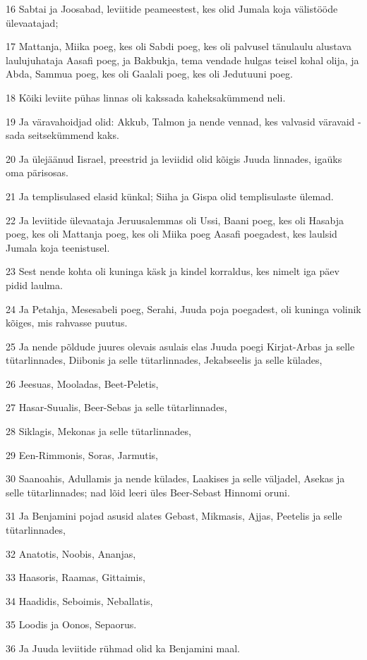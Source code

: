 \par 16 Sabtai ja Joosabad, leviitide peameestest, kes olid Jumala koja välistööde ülevaatajad;
\par 17 Mattanja, Miika poeg, kes oli Sabdi poeg, kes oli palvusel tänulaulu alustava laulujuhataja Aasafi poeg, ja Bakbukja, tema vendade hulgas teisel kohal olija, ja Abda, Sammua poeg, kes oli Gaalali poeg, kes oli Jedutuuni poeg.
\par 18 Kõiki leviite pühas linnas oli kakssada kaheksakümmend neli.
\par 19 Ja väravahoidjad olid: Akkub, Talmon ja nende vennad, kes valvasid väravaid - sada seitsekümmend kaks.
\par 20 Ja ülejäänud Iisrael, preestrid ja leviidid olid kõigis Juuda linnades, igaüks oma pärisosas.
\par 21 Ja templisulased elasid künkal; Siiha ja Gispa olid templisulaste ülemad.
\par 22 Ja leviitide ülevaataja Jeruusalemmas oli Ussi, Baani poeg, kes oli Hasabja poeg, kes oli Mattanja poeg, kes oli Miika poeg Aasafi poegadest, kes laulsid Jumala koja teenistusel.
\par 23 Sest nende kohta oli kuninga käsk ja kindel korraldus, kes nimelt iga päev pidid laulma.
\par 24 Ja Petahja, Mesesabeli poeg, Serahi, Juuda poja poegadest, oli kuninga volinik kõiges, mis rahvasse puutus.
\par 25 Ja nende põldude juures olevais asulais elas Juuda poegi Kirjat-Arbas ja selle tütarlinnades, Diibonis ja selle tütarlinnades, Jekabseelis ja selle külades,
\par 26 Jeesuas, Mooladas, Beet-Peletis,
\par 27 Hasar-Suualis, Beer-Sebas ja selle tütarlinnades,
\par 28 Siklagis, Mekonas ja selle tütarlinnades,
\par 29 Een-Rimmonis, Soras, Jarmutis,
\par 30 Saanoahis, Adullamis ja nende külades, Laakises ja selle väljadel, Asekas ja selle tütarlinnades; nad lõid leeri üles Beer-Sebast Hinnomi oruni.
\par 31 Ja Benjamini pojad asusid alates Gebast, Mikmasis, Ajjas, Peetelis ja selle tütarlinnades,
\par 32 Anatotis, Noobis, Ananjas,
\par 33 Haasoris, Raamas, Gittaimis,
\par 34 Haadidis, Seboimis, Neballatis,
\par 35 Loodis ja Oonos, Sepaorus.
\par 36 Ja Juuda leviitide rühmad olid ka Benjamini maal.


